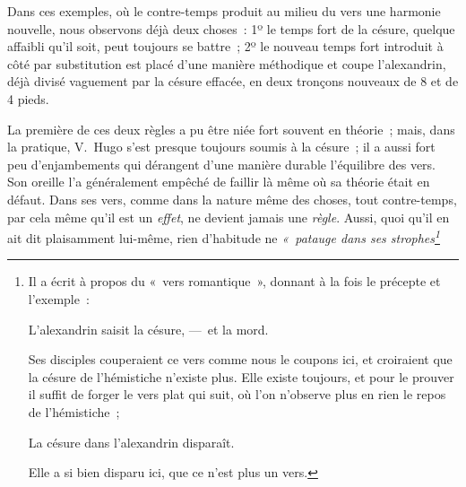 \documentclass[french,twoside]{book} %
\begin{document}
\noindent Dans ces exemples, où le contre-temps produit au milieu  du vers une harmonie nouvelle, nous observons déjà deux choses : 1º le temps fort de la césure, quelque affaibli qu’il soit, peut toujours se battre ; 2º le nouveau temps fort introduit à côté par substitution est placé d’une manière méthodique et coupe l’alexandrin, déjà divisé vaguement par la césure effacée, en deux tronçons nouveaux de 8 et de 4 pieds.\par
La première de ces deux règles a pu être niée fort souvent en théorie ; mais, dans la pratique, V. Hugo s’est presque toujours soumis à la césure ; il a aussi fort peu d’enjambements qui dérangent d’une manière durable l’équilibre des vers. Son oreille l’a généralement empêché de faillir là même où sa théorie était en défaut. Dans ses vers, comme dans la nature même des choses, tout contre-temps, par cela même qu’il est un \emph{effet}, ne devient jamais une \emph{règle}. Aussi, quoi qu’il en ait dit plaisamment  lui-même, rien d’habitude ne \emph{« patauge dans ses strophes\footnote{\noindent Il a écrit à propos du « vers romantique », donnant à la fois le précepte et l’exemple :\par
L’alexandrin saisit la césure, — et la mord.\\
\par
\noindent Ses disciples couperaient ce vers comme nous le coupons ici, et croiraient que la césure de l’hémistiche n’existe plus. Elle existe toujours, et pour le prouver il suffit de forger le vers plat qui suit, où l’on n’observe plus en rien le repos de l’hémistiche ;\par
La césure dans l’alexandrin disparaît.\\
\par
\noindent Elle a si bien disparu ici, que ce n’est plus un vers.
}}
\end{document}
